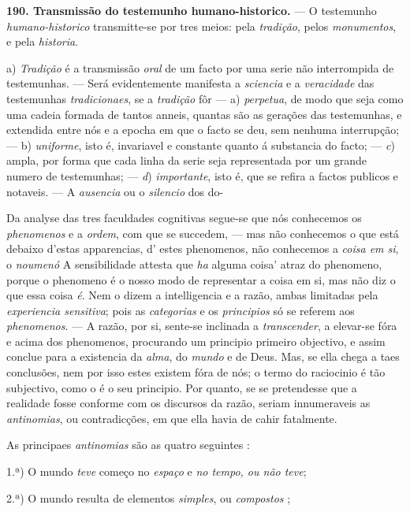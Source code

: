 \textbf{190. Transmissão do testemunho humano-historico.} --- O testemunho \emph{humano-historico} transmitte-se por tres meios: pela \emph{tradição}, pelos \emph{monumentos}, e pela \emph{historia}.

a) \emph{Tradição} é a transmissão \emph{oral} de um facto por uma serie   não interrompida de testemunhas. --- Será evidentemente manifesta a \emph{sciencia} e a \emph{veracidade} das testemunhas \emph{tradicionaes}, se a \emph{tradição} fôr --- a) \emph{perpetua}, de modo que seja como uma cadeia formada de tantos anneis, quantas são as gerações das   testemunhas, e extendida entre nós e a epocha em que o facto se deu, sem nenhuma interrupção; --- b) \emph{uniforme}, isto é, invariavel e constante quanto á substancia do facto; --- \emph{c}) ampla, por forma   que cada linha da serie seja representada por um grande numero de testemunhas; --- \emph{d}) \emph{importante}, isto é, que se refira a factos publicos e notaveis. --- A \emph{ausencia} ou o \emph{silencio} dos do-

Da analyse das tres faculdades cognitivas segue-se que nós conhecemos os \emph{phenomenos} e a \emph{ordem}, com que se succedem, --- mas não conhecemos o que está debaixo d'estas apparencias, d' estes phenomenos, não conhecemos a \emph{coisa em si}, o \emph{noumenó} A sensibilidade attesta que \emph{ha} alguma coisa' atraz do phenomeno, porque o phenomeno é o nosso modo de representar a coisa em si, mas não diz o que essa coisa \emph{é}. Nem o dizem a intelligencia e a razão, ambas limitadas pela \emph{experiencia sensitiva}; pois as \emph{categorias} e os \emph{principios} só se referem aos \emph{phenomenos}. --- A razão, por si, sente-se inclinada a \emph{transcender}, a elevar-se fóra e acima dos phenomenos, procurando um principio primeiro objectivo, e assim conclue para a existencia da \emph{alma}, do \emph{mundo} e de Deus. Mas, se ella chega a taes conclusões, nem por isso estes existem fóra de nós; o termo do raciocinio é tão subjectivo, como o é o seu principio. Por quanto, se se pretendesse que a realidade fosse conforme com os discursos da razão, seriam innumeraveis as \emph{antinomias}, ou contradicções, em que ella havia de cahir fatalmente.

As principaes \emph{antinomias} são as quatro seguintes :

1.ª) O mundo \emph{teve} começo no \emph{espaço} e \emph{no tempo, ou não teve};

2.ª) O mundo resulta de elementos \emph{simples}, ou \emph{compostos} ;

